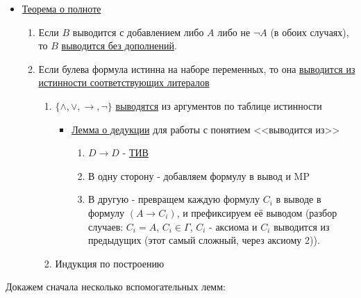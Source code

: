 \begin{itemize}
    \item \hyperref[logic_completeness_1]{Теорема о полноте}
        \begin{enumerate}
            \item Если $B$ выводится с добавлением либо $A$ либо не $\neg A$ (в обоих случаях), то $B$ \hyperref[logic_collapse]{выводится без дополнений}.
            \item Если булева формула истинна на наборе переменных, то она \hyperref[logic_truth_table]{выводится из истинности соответствующих литералов}
                \begin{enumerate}
                    \item $\{\land, \lor, \to, \neg\}$ \hyperref[logic_truth_table_base]{выводятся} из аргументов по таблице истинности
                        \begin{itemize}
                            \item \hyperref[logic_DT]{Лемма о дедукции} для работы с понятием <<выводится из>>
                            \begin{enumerate}
                                \item $D \to D$ - \hyperref[logic_ID]{ТИВ}
                                \item В одну сторону - добавляем формулу в вывод и MP
                                \item В другую - превращем каждую формулу $C_{i}$ в выводе в формулу $(A \to C_{i})$, и префиксируем её выводом (разбор случаев: $C_{i} = A$, $C_{i}\in \Gamma$, $C_{i}$ - аксиома и $C_{i}$ выводится из предыдущих (этот самый сложный, через аксиому 2)).
                            \end{enumerate}
                        \end{itemize}
                    \item Индукция по построению
                \end{enumerate}
        \end{enumerate}
\end{itemize}


Докажем сначала несколько вспомогательных лемм:


